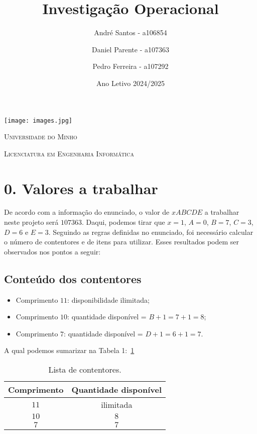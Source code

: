 \documentclass[a4paper,12pt]{article}
\title{
    Investigação Operacional\protect\\
}
\author{André Santos - a106854
    \and Daniel Parente - a107363
    \and Pedro Ferreira - a107292
}
\date{Ano Letivo 2024/2025}
\begin{document}
\vspace*{\fill} %

\begin{minipage}{0.9\linewidth}
    \centering
    \texttt{[image: images.jpg]}\par
    \vspace{1cm}

    {\scshape\LARGE Universidade do Minho} \par
    \vspace{0.6cm}

    {\scshape\Large Licenciatura em Engenharia Informática} \par
    \maketitle
    \vspace{1cm}
\end{minipage}

\vspace*{\fill}

\pagebreak
\section*{0. Valores a trabalhar}

De acordo com a informação do enunciado, o valor de $xABCDE$ a trabalhar neste projeto será $107363$. Daqui, podemos tirar que $x = 1$, $A = 0$, $B = 7$, $C = 3$, $D = 6$ e $E = 3$.
Seguindo as regras definidas no enunciado, foi necessário calcular o número de contentores e de itens para utilizar. Esses resultados podem ser observados nos pontos a seguir:
\subsection*{Conteúdo dos contentores}
\begin{itemize}
  \item Comprimento $11$: disponibilidade ilimitada;
  \item Comprimento $10$: quantidade disponível = $B + 1 = 7 + 1 = 8$;
  \item Comprimento $7$: quantidade disponível = $D + 1 = 6 + 1 = 7$.
\end{itemize}

A qual podemos sumarizar na Tabela 1:~\ref{tab:contentores}

\begin{table}[h!]
\centering
\label{tab:contentores}
\begin{tabular}{@{}c c@{}}
\toprule
\textbf{Comprimento} & \textbf{Quantidade disponível} \\
\midrule
$11$ & ilimitada \\
$10$ & $8$        \\
$7$  & $7$        \\
\bottomrule
\end{tabular}
\caption{Lista de contentores.}
\end{table}
\end{document}
